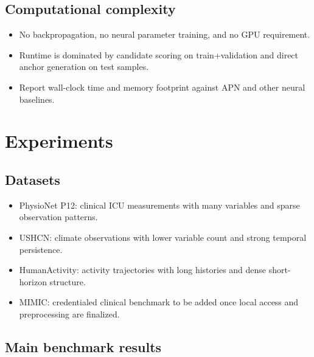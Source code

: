 \documentclass{article}
\begin{document}
\subsection{Computational complexity}

\begin{itemize}
    \item No backpropagation, no neural parameter training, and no GPU
    requirement.
    \item Runtime is dominated by candidate scoring on train+validation and
    direct anchor generation on test samples.
    \item Report wall-clock time and memory footprint against APN and other
    neural baselines.
\end{itemize}

\section{Experiments}

\subsection{Datasets}

\begin{itemize}
    \item PhysioNet P12: clinical ICU measurements with many variables and
    sparse observation patterns.
    \item USHCN: climate observations with lower variable count and strong
    temporal persistence.
    \item HumanActivity: activity trajectories with long histories and dense
    short-horizon structure.
    \item MIMIC: credentialed clinical benchmark to be added once local access
    and preprocessing are finalized.
\end{itemize}

\subsection{Main benchmark results}
\end{document}
